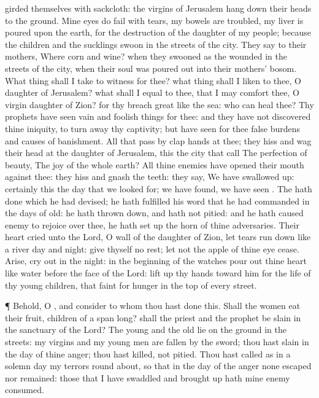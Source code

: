 {girded themselves with
sackcloth: the
virgins of
Jerusalem hang
down their
heads to the
ground.
Mine
eyes do
fail with
tears, my
bowels are
troubled, my
liver is
poured upon the
earth, for the
destruction of the
daughter of my
people; because the
children and the
sucklings
swoon in the
streets of the
city.
They
say to their
mothers, Where
{}
corn and
wine? when they
swooned as the
wounded in the
streets of the
city, when their
soul was poured
out into their
mothers’
bosom.
What thing shall I take to
witness for thee? what
thing shall I
liken to thee, O
daughter of
Jerusalem? what shall I
equal to thee, that I may
comfort thee, O
virgin
daughter of
Zion? for thy
breach
{}
great like the
sea: who can
heal thee?
Thy
prophets have
seen
vain and foolish
things for thee: and they have not
discovered thine
iniquity, to turn
away thy
captivity; but have
seen for thee
false
burdens and causes of
banishment.
All that
pass by
clap
{}
hands at
thee; they
hiss and
wag their
head at the
daughter of
Jerusalem,
{} this the
city that
{}
call The
perfection of
beauty, The
joy of the whole
earth?
All thine
enemies have
opened their
mouth against thee: they
hiss and
gnash the
teeth: they
say, We have swallowed
{}
up:
certainly this
{} the
day that we looked
for; we have
found, we have
seen
{}.
The
{} hath
done
{} which he had
devised; he hath
fulfilled his
word that he had
commanded in the
days of
old: he hath thrown
down, and hath not
pitied: and he hath caused
{}
enemy to
rejoice over thee, he hath set
up the
horn of thine
adversaries.
Their
heart
cried unto the
Lord, O
wall of the
daughter of
Zion, let
tears run
down like a
river
day and
night:
give thyself no
rest; let not the
apple of thine
eye
cease.
Arise, cry
out in the
night: in the
beginning of the
watches pour
out thine
heart like
water
before the
face of the
Lord: lift
up thy
hands toward him for the
life of thy young
children, that
faint for
hunger in the
top of every
street.
\par }{\PP {}¶
Behold, O
{}, and
consider to whom thou hast
done
this. Shall the
women
eat their
fruit,
{}
children of a span
long? shall the
priest and the
prophet be
slain in the
sanctuary of the
Lord?
The
young and the
old
lie on the
ground in the
streets: my
virgins and my young
men are
fallen by the
sword; thou hast
slain
{} in the
day of thine
anger; thou hast
killed,
{} not
pitied.
Thou hast
called as in a
solemn
day my
terrors round
about, so that in the
day of the
{}
anger none
escaped nor
remained: those that I have
swaddled and brought
up hath mine
enemy
consumed.

}
